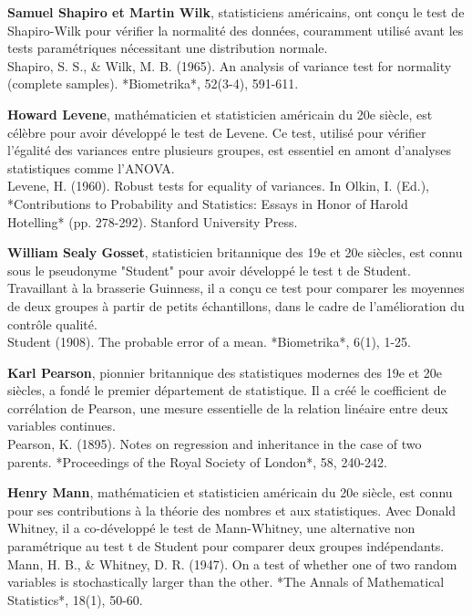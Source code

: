 \begin{thebibliography}{9}
\textbf{Samuel Shapiro et Martin Wilk}, statisticiens américains, ont conçu le test de Shapiro-Wilk pour vérifier la normalité des données, couramment utilisé avant les tests paramétriques nécessitant une distribution normale.\\
Shapiro, S. S., \& Wilk, M. B. (1965). An analysis of variance test for normality (complete samples). *Biometrika*, 52(3-4), 591-611.

\textbf{Howard Levene}, mathématicien et statisticien américain du 20e siècle, est célèbre pour avoir développé le test de Levene. Ce test, utilisé pour vérifier l'égalité des variances entre plusieurs groupes, est essentiel en amont d'analyses statistiques comme l'ANOVA.\\
Levene, H. (1960). Robust tests for equality of variances. In Olkin, I. (Ed.), *Contributions to Probability and Statistics: Essays in Honor of Harold Hotelling* (pp. 278-292). Stanford University Press.

\textbf{William Sealy Gosset}, statisticien britannique des 19e et 20e siècles, est connu sous le pseudonyme "Student" pour avoir développé le test t de Student. Travaillant à la brasserie Guinness, il a conçu ce test pour comparer les moyennes de deux groupes à partir de petits échantillons, dans le cadre de l'amélioration du contrôle qualité. \\ 
Student (1908). The probable error of a mean. *Biometrika*, 6(1), 1-25.

\textbf{Karl Pearson}, pionnier britannique des statistiques modernes des 19e et 20e siècles, a fondé le premier département de statistique. Il a créé le coefficient de corrélation de Pearson, une mesure essentielle de la relation linéaire entre deux variables continues.\\ 
Pearson, K. (1895). Notes on regression and inheritance in the case of two parents. *Proceedings of the Royal Society of London*, 58, 240-242.

\textbf{Henry Mann}, mathématicien et statisticien américain du 20e siècle, est connu pour ses contributions à la théorie des nombres et aux statistiques. Avec Donald Whitney, il a co-développé le test de Mann-Whitney, une alternative non paramétrique au test t de Student pour comparer deux groupes indépendants.\\
Mann, H. B., \& Whitney, D. R. (1947). On a test of whether one of two random variables is stochastically larger than the other. *The Annals of Mathematical Statistics*, 18(1), 50-60.


\end{thebibliography}
